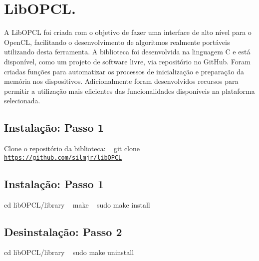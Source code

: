 \hypertarget{index_Introdução}{}\section{Lib\+O\+P\+C\+L.}\label{index_Introdução}
A Lib\+O\+P\+CL foi criada com o objetivo de fazer uma interface de alto nível para o Open\+CL, facilitando o desenvolvimento de algoritmos realmente portáveis utilizando desta ferramenta. A biblioteca foi desenvolvida na linguagem C e está disponível, como um projeto de software livre, via repositório no Git\+Hub. Foram criadas funções para automatizar os processos de inicialização e preparação da memória nos dispositivos. Adicionalmente foram desenvolvidos recursos para permitir a utilização mais eficientes das funcionalidades disponíveis na plataforma selecionada. \hypertarget{index_Install}{}\subsection{Instalação\+: Passo 1}\label{index_Install}
Clone o repositório da biblioteca\+: ~\newline
 git clone \href{https://github.com/silmjr/libOPCL}{\tt https\+://github.\+com/silmjr/lib\+O\+P\+CL} \hypertarget{index_Install}{}\subsection{Instalação\+: Passo 1}\label{index_Install}
cd lib\+O\+P\+C\+L/library ~\newline
 make ~\newline
 sudo make install \hypertarget{index_uninstall}{}\subsection{Desinstalação\+: Passo 2}\label{index_uninstall}
cd lib\+O\+P\+C\+L/library ~\newline
 sudo make uninstall 